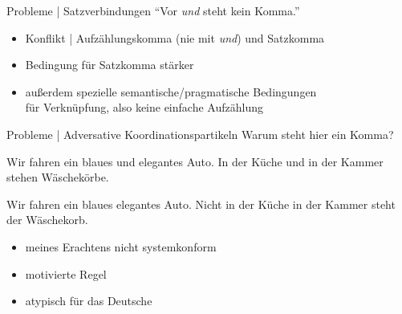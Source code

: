 \begin{frame}
  {Probleme | Satzverbindungen}
  \onslide<+->
  \onslide<+->
  "`Vor \textit{und} steht kein Komma."'\\
  \Zeile
  \onslide<+->
  \begin{exe}
  \end{exe}
  \Zeile
  \begin{itemize}[<+->]
    \item Konflikt | Aufzählungskomma (nie mit \textit{und}) und Satzkomma
    \item Bedingung für Satzkomma stärker  
    \item außerdem spezielle semantische\slash pragmatische Bedingungen\\
      für Verknüpfung, also keine einfache Aufzählung
  \end{itemize}
\end{frame}

\begin{frame}
  {Probleme | Adversative Koordinationspartikeln}
  \onslide<+->
  \onslide<+->
  Warum steht hier ein Komma?\\
  \onslide<+->
  \Zeile
  \begin{exe}
    \ex
    \begin{xlist}
      \ex Wir fahren ein blaues \alert{und} elegantes Auto.
      \ex In der Küche \alert{und} in der Kammer stehen Wäschekörbe.
    \end{xlist}
    \ex
    \begin{xlist}
      \ex Wir fahren ein blaues elegantes Auto.
      \ex Nicht in der Küche in der Kammer steht der Wäschekorb.
    \end{xlist}
  \end{exe}
  \Zeile
  \begin{itemize}[<+->]
    \item meines Erachtens nicht systemkonform
    \item {} motivierte Regel
    \item atypisch für das Deutsche
  \end{itemize}
\end{frame}

